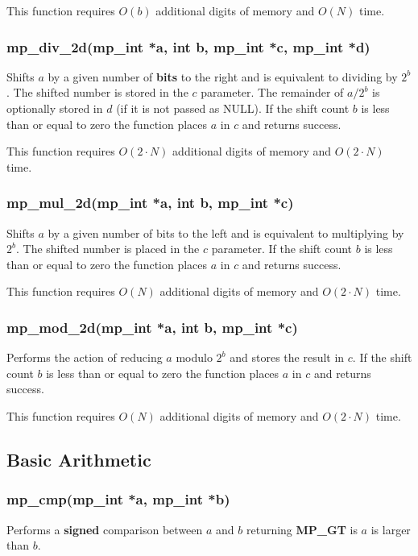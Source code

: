 \documentclass{article}
\begin{document}
This function requires $O(b)$ additional digits of memory and $O(N)$ time.

\subsubsection{mp\_div\_2d(mp\_int *a, int b, mp\_int *c, mp\_int *d)}
Shifts $a$ by a given number of \textbf{bits} to the right and is equivalent to dividing by $2^b$.  The shifted number is stored
in the $c$ parameter.  The remainder of $a/2^b$ is optionally stored in $d$ (if it is not passed as NULL).  
If the shift count $b$ is less than or equal to zero the function places $a$ in $c$ and returns success.  

This function requires $O(2 \cdot N)$ additional digits of memory and $O(2 \cdot N)$ time.

\subsubsection{mp\_mul\_2d(mp\_int *a, int b, mp\_int *c)}
Shifts $a$ by a given number of bits to the left and is equivalent to multiplying by $2^b$.  The shifted number
is placed in the $c$ parameter.  If the shift count $b$ is less than or equal to zero the function places $a$
in $c$ and returns success.  

This function requires $O(N)$ additional digits of memory and $O(2 \cdot N)$ time.

\subsubsection{mp\_mod\_2d(mp\_int *a, int b, mp\_int *c)}
Performs the action of reducing $a$ modulo $2^b$ and stores the result in $c$.  If the shift count $b$ is less than 
or equal to zero the function places $a$ in $c$ and returns success.  

This function requires $O(N)$ additional digits of memory and $O(2 \cdot N)$ time.

\subsection{Basic Arithmetic}

\subsubsection{mp\_cmp(mp\_int *a, mp\_int *b)}
Performs a \textbf{signed} comparison between $a$ and $b$ returning \textbf{MP\_GT} is $a$ is larger than $b$.
\end{document}
